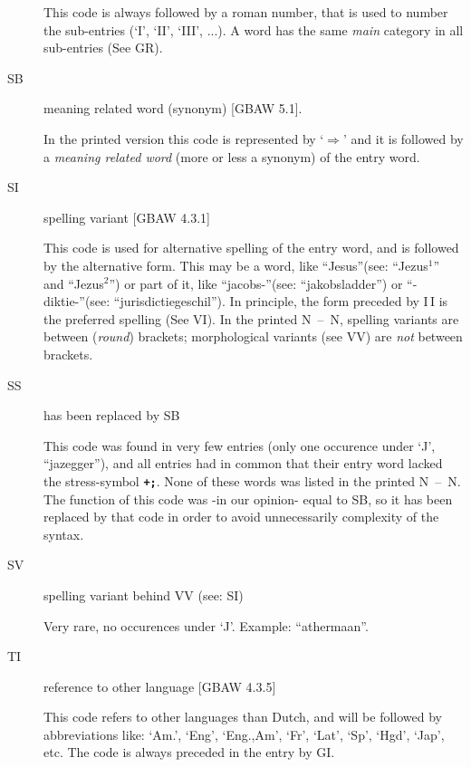 \begin{description}
        This code is always followed by a roman number, that is used to number
        the sub-entries (`I', `II', `III', ...). A word has the same {\em main}
        category in all sub-entries (See GR).

   \item [SB] meaning related word (synonym) [GBAW 5.1].

         In the printed version this code is represented by
         `$\Rightarrow$' and it is followed by a {\em meaning related word}
         (more or less a synonym) of the entry word.

   \item [SI] spelling variant [GBAW 4.3.1]

        This code is used for alternative spelling of the entry word,
        and is followed by the alternative form. This may be a word, like
        ``Jesus''(see: ``Jezus$^{1}$'' and ``Jezus$^{2}$'') or part of it, like
        ``jacobs-''(see: ``jakobsladder'') or \mbox{``-diktie-''}(see: 
        ``jurisdictiegeschil''). In principle, the form preceded by I\,I is
        the preferred spelling (See VI). In the printed N~--~N, spelling 
        variants 
        are between ({\em round}) brackets; morphological variants (see VV) are 
        {\em not} between brackets.

   \item [SS] has been replaced by SB

        This code was found in very few entries (only one occurence under `J',
        ``jazegger''), and all
        entries had in common that their entry word lacked the stress-symbol
        {\bf {\tt +;}}. None of these words was listed in the printed N~--~N. The 
        function of this code was -in our opinion- equal to SB, so
        it has been replaced by that code in order to avoid unnecessarily
        complexity of the syntax. 
        
   \item [SV] spelling variant behind VV (see: SI)

        Very rare, no occurences under `J'. Example: ``athermaan''.

   \item [TI] reference to other language [GBAW 4.3.5]

        This code refers to other languages than Dutch, and will be followed by
        abbreviations like: `Am.', `Eng', `Eng.,Am', `Fr', `Lat', `Sp', `Hgd',
        `Jap', etc. The code is always preceded in the entry by GI.


\end{description}
